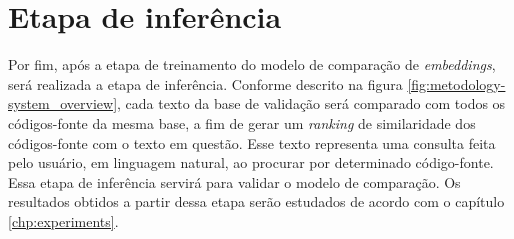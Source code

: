 \section{Etapa de inferência}
Por fim, após a etapa de treinamento do modelo de comparação de \textit{embeddings}, será realizada a etapa de inferência. Conforme descrito na figura \ref{fig:metodology-system_overview}, cada texto da base de validação será comparado com todos os códigos-fonte da mesma base, a fim de gerar um \textit{ranking} de similaridade dos códigos-fonte com o texto em questão. Esse texto representa uma consulta feita pelo usuário, em linguagem natural, ao procurar por determinado código-fonte.
Essa etapa de inferência servirá para validar o modelo de comparação. Os resultados obtidos a partir dessa etapa serão estudados de acordo com o capítulo \ref{chp:experiments}.


